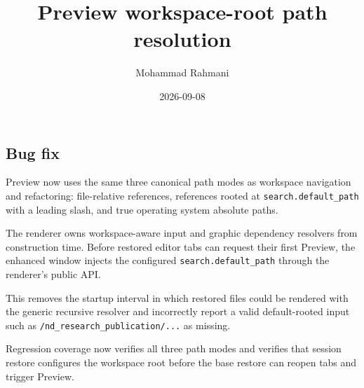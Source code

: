 \documentclass[a4paper]{article}
\title{Preview workspace-root path resolution}
\date{2026-09-08}
\author{Mohammad Rahmani}
\begin{document}
   \maketitle

   \begin{preview}
      \section{Bug fix}

      Preview now uses the same three canonical path modes as workspace
      navigation and refactoring: file-relative references, references rooted
      at \texttt{search.default\_path} with a leading slash, and true operating
      system absolute paths.

      The renderer owns workspace-aware input and graphic dependency resolvers
      from construction time.  Before restored editor tabs can request their
      first Preview, the enhanced window injects the configured
      \texttt{search.default\_path} through the renderer's public API.

      This removes the startup interval in which restored files could be
      rendered with the generic recursive resolver and incorrectly report a
      valid default-rooted input such as
      \texttt{/nd\_research\_publication/...} as missing.

      Regression coverage now verifies all three path modes and verifies that
      session restore configures the workspace root before the base restore
      can reopen tabs and trigger Preview.
   \end{preview}

   
   
\end{document}
